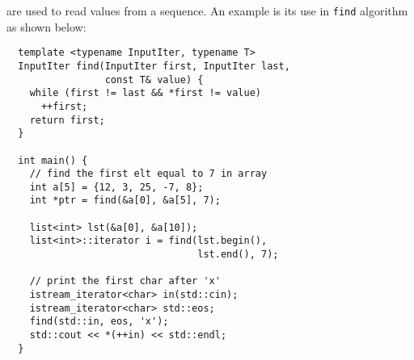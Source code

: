 \documentclass{memo}
\begin{document}

 are used to read values from a sequence. An example is
its use in \verb+find+ algorithm as shown below:

\begin{verbatim}
  template <typename InputIter, typename T>
  InputIter find(InputIter first, InputIter last,
                 const T& value) {
    while (first != last && *first != value)
      ++first;
    return first;
  }
  
  int main() {
    // find the first elt equal to 7 in array
    int a[5] = {12, 3, 25, -7, 8};
    int *ptr = find(&a[0], &a[5], 7);

    list<int> lst(&a[0], &a[10]);
    list<int>::iterator i = find(lst.begin(), 
                                 lst.end(), 7);

    // print the first char after 'x'
    istream_iterator<char> in(std::cin);
    istream_iterator<char> std::eos;
    find(std::in, eos, 'x');
    std::cout << *(++in) << std::endl;
  }
\end{verbatim}
\end{document}
